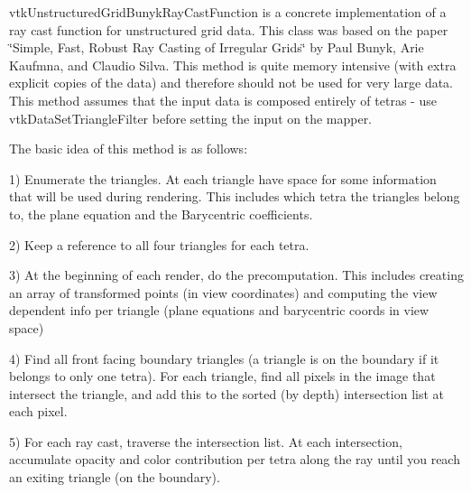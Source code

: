 vtk\-Unstructured\-Grid\-Bunyk\-Ray\-Cast\-Function is a concrete implementation of a ray cast function for unstructured grid data. This class was based on the paper \char`\"{}\-Simple, Fast, Robust Ray Casting of Irregular Grids\char`\"{} by Paul Bunyk, Arie Kaufmna, and Claudio Silva. This method is quite memory intensive (with extra explicit copies of the data) and therefore should not be used for very large data. This method assumes that the input data is composed entirely of tetras -\/ use vtk\-Data\-Set\-Triangle\-Filter before setting the input on the mapper.

The basic idea of this method is as follows\-:

1) Enumerate the triangles. At each triangle have space for some information that will be used during rendering. This includes which tetra the triangles belong to, the plane equation and the Barycentric coefficients.

2) Keep a reference to all four triangles for each tetra.

3) At the beginning of each render, do the precomputation. This includes creating an array of transformed points (in view coordinates) and computing the view dependent info per triangle (plane equations and barycentric coords in view space)

4) Find all front facing boundary triangles (a triangle is on the boundary if it belongs to only one tetra). For each triangle, find all pixels in the image that intersect the triangle, and add this to the sorted (by depth) intersection list at each pixel.

5) For each ray cast, traverse the intersection list. At each intersection, accumulate opacity and color contribution per tetra along the ray until you reach an exiting triangle (on the boundary).

